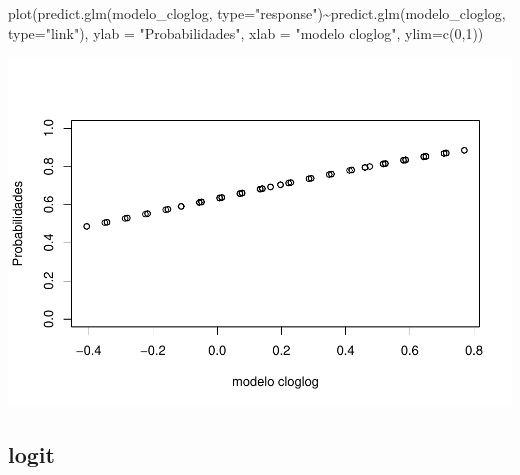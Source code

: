 \documentclass[
]{article}
\newenvironment{Shaded}{\begin{snugshade}}{\end{snugshade}}
\newcommand{\AttributeTok}[1]{\textcolor[rgb]{0.80,0.80,0.80}{#1}}
\newcommand{\DecValTok}[1]{\textcolor[rgb]{0.86,0.86,0.80}{#1}}
\newcommand{\FunctionTok}[1]{\textcolor[rgb]{0.94,0.94,0.56}{#1}}
\newcommand{\NormalTok}[1]{\textcolor[rgb]{0.80,0.80,0.80}{#1}}
\newcommand{\OtherTok}[1]{\textcolor[rgb]{0.94,0.94,0.56}{#1}}
\newcommand{\SpecialCharTok}[1]{\textcolor[rgb]{0.86,0.64,0.64}{#1}}
\newcommand{\StringTok}[1]{\textcolor[rgb]{0.80,0.58,0.58}{#1}}
\begin{document}
\begin{Shaded}
\begin{Highlighting}[]
\FunctionTok{plot}\NormalTok{(}\FunctionTok{predict.glm}\NormalTok{(modelo\_cloglog, }\AttributeTok{type=}\StringTok{"response"}\NormalTok{)}\SpecialCharTok{\textasciitilde{}}\FunctionTok{predict.glm}\NormalTok{(modelo\_cloglog, }\AttributeTok{type=}\StringTok{"link"}\NormalTok{),}
     \AttributeTok{ylab =} \StringTok{"Probabilidades"}\NormalTok{,}
     \AttributeTok{xlab =}  \StringTok{"modelo cloglog"}\NormalTok{,}
     \AttributeTok{ylim=}\FunctionTok{c}\NormalTok{(}\DecValTok{0}\NormalTok{,}\DecValTok{1}\NormalTok{))}
\end{Highlighting}
\end{Shaded}

\includegraphics{EDA__files/figure-latex/unnamed-chunk-9-2.pdf}

\hypertarget{logit}{%
\subsection{logit}\label{logit}}

\begin{Shaded}
\end{Shaded}
\end{document}
